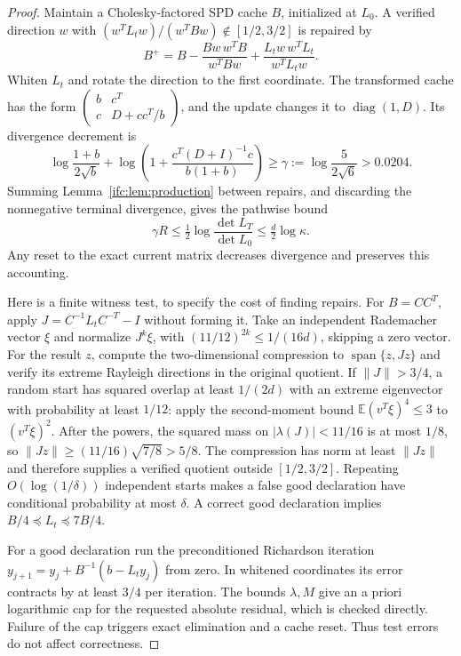 \documentclass[11pt]{amsart}
\theoremstyle{definition}\newtheorem{definition}[theorem]{Definition}
\theoremstyle{remark}\newtheorem{remark}[theorem]{Remark}
\numberwithin{equation}{section}
\newcommand{\diag}{\operatorname{diag}}
\begin{document}
\begin{proof}
Maintain a Cholesky-factored SPD cache $B$, initialized at $L_0$.
A verified direction $w$ with
$(w^TL_tw)/(w^TBw)\notin[1/2,3/2]$ is repaired by
\begin{equation}\label{ifc:eq:bfgs}
 B^+=B-\frac{Bw\,w^TB}{w^TBw}
          +\frac{L_tw\,w^TL_t}{w^TL_tw}.
\end{equation}
Whiten $L_t$ and rotate the direction to the first coordinate. The
transformed cache has the form
$\left(\begin{smallmatrix}b&c^T\\c&D+cc^T/b\end{smallmatrix}\right)$,
and the update changes it to $\diag(1,D)$. Its divergence decrement is
\[
 \log\frac{1+b}{2\sqrt b}
 +\log\left(1+\frac{c^T(D+I)^{-1}c}{b(1+b)}\right)
 \ge\gamma:=\log\frac5{2\sqrt6}>0.0204.
\]
Summing Lemma~\ref{ifc:lem:production} between repairs, and discarding
the nonnegative terminal divergence, gives the pathwise bound
\begin{equation}\label{ifc:eq:repaircount}
 \gamma R\le\tfrac12\log\frac{\det L_T}{\det L_0}
 \le\tfrac d2\log\kappa.
\end{equation}
Any reset to the exact current matrix decreases divergence and preserves
this accounting.

Here is a finite witness test, to specify the cost of finding repairs.
For $B=CC^T$, apply $J=C^{-1}L_tC^{-T}-I$ without forming it.
Take an independent Rademacher vector $\xi$ and normalize $J^k\xi$,
with $(11/12)^{2k}\le1/(16d)$, skipping a zero vector. For the result
$z$, compute the two-dimensional compression to $\operatorname{span}\{z,Jz\}$
and verify its extreme Rayleigh directions in the original quotient.
If $\|J\|>3/4$, a random start has squared overlap at least $1/(2d)$
with an extreme eigenvector with probability at least $1/12$:
apply the second-moment bound
$\mathbb E(v^T\xi)^4\le3$ to $(v^T\xi)^2$.
After the powers, the squared mass on $|\lambda(J)|<11/16$ is at
most $1/8$, so $\|Jz\|\ge(11/16)\sqrt{7/8}>5/8$.
The compression has norm at least $\|Jz\|$ and therefore supplies
a verified quotient outside $[1/2,3/2]$.
Repeating $O(\log(1/\delta))$ independent starts makes a false good
declaration have conditional probability at most $\delta$.
A correct good declaration implies
$B/4\preceq L_t\preceq7B/4$.

For a good declaration run the preconditioned Richardson iteration
$y_{j+1}=y_j+B^{-1}(b-L_ty_j)$ from zero. In whitened coordinates
its error contracts by at least $3/4$ per iteration. The bounds
$\lambda,M$ give an a priori logarithmic cap for the requested
absolute residual, which is checked directly. Failure of the cap
triggers exact elimination and a cache reset. Thus test errors do
not affect correctness.


\end{proof}
\end{document}
